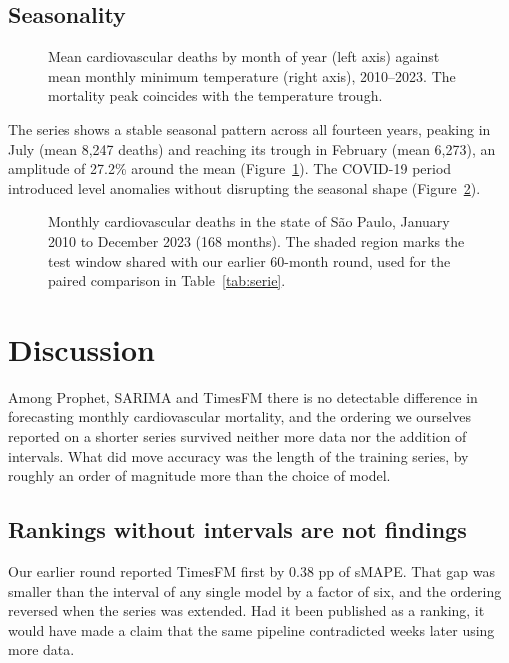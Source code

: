 \subsection{Seasonality}

\begin{figure}[htbp]
\centering

\caption{Mean cardiovascular deaths by month of year (left axis) against mean monthly
minimum temperature (right axis), 2010--2023. The mortality peak coincides with the
temperature trough.}
\label{fig:sazonal}
\end{figure}

The series shows a stable seasonal pattern across all fourteen years, peaking in July
(mean 8{,}247 deaths) and reaching its trough in February (mean 6{,}273), an amplitude of
27.2\% around the mean (Figure~\ref{fig:sazonal}). The COVID-19 period introduced level
anomalies without disrupting the seasonal shape (Figure~\ref{fig:serie}).

\begin{figure}[htbp]
\centering

\caption{Monthly cardiovascular deaths in the state of S\~ao Paulo, January 2010 to
December 2023 (168 months). The shaded region marks the test window shared with our
earlier 60-month round, used for the paired comparison in Table~\ref{tab:serie}.}
\label{fig:serie}
\end{figure}

\section{Discussion}

Among Prophet, SARIMA and TimesFM there is no detectable difference in forecasting monthly
cardiovascular mortality, and the ordering we ourselves reported on a shorter series
survived neither more data nor the addition of intervals. What did move accuracy was the
length of the training series, by roughly an order of magnitude more than the choice of
model.

\subsection{Rankings without intervals are not findings}

Our earlier round reported TimesFM first by 0.38 pp of sMAPE. That gap was smaller than the
interval of any single model by a factor of six, and the ordering reversed when the series
was extended. Had it been published as a ranking, it would have made a claim that the same
pipeline contradicted weeks later using more data.

